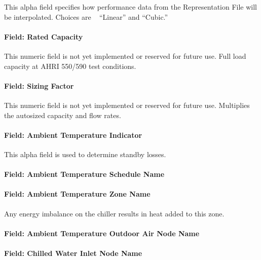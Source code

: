 This alpha field specifies how performance data from the Representation File will be interpolated. Choices are ~ ``Linear'' and ``Cubic.''~

\paragraph{Field: Rated Capacity}\label{field-chiller205-rated-capacity}

This numeric field is not yet implemented or reserved for future use. Full load capacity at AHRI 550/590 test conditions.

\paragraph{Field: Sizing Factor}\label{field-chiller205-sizing-factor}

This numeric field is not yet implemented or reserved for future use. Multiplies the autosized capacity and flow rates.

\paragraph{Field: Ambient Temperature Indicator}\label{field-chiller205-ambient-temperature-indicator}

This alpha field is used to determine standby losses.

\paragraph{Field: Ambient Temperature Schedule Name}\label{field-chiller205-ambient-temperature-schedule-name}

\paragraph{Field: Ambient Temperature Zone Name}\label{field-chiller205-ambient-temperature-zone-name}

Any energy imbalance on the chiller results in heat added to this zone.

\paragraph{Field: Ambient Temperature Outdoor Air Node Name}\label{field-chiller205-ambient-temperature-outdoor-air-node-name}

\paragraph{Field: Chilled Water Inlet Node Name}\label{field-chiller205-chilled-water-inlet-node-name}

